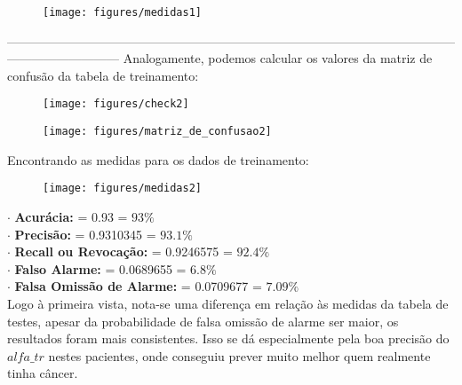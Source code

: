 \documentclass[leqno]{article}
\numberwithin{equation}{section}
\begin{document}
\begin{enumerate}
	\begin{figure}[H]
		\centering
		\texttt{[image: figures/medidas1]}
	\end{figure}
	
---------------------------------------------------------------------------------------------------------------------------------------
	Analogamente, podemos calcular os valores da matriz de confusão da tabela de treinamento:
	
	\begin{figure}[H]
		\centering
		\texttt{[image: figures/check2]}
	\end{figure}

	\begin{figure}[H]
		\centering
		\texttt{[image: figures/matriz\_de\_confusao2]}
	\end{figure}

	Encontrando as medidas para os dados de treinamento:
	
	\begin{figure}[H]
		\centering
		\texttt{[image: figures/medidas2]}
	\end{figure}

	$\cdot$ \textbf{{\normalsize Acurácia:}} = 0.93 = $93\%$\\
	$\cdot$ \textbf{{\normalsize Precisão:}} = 0.9310345 = $93.1\%$\\
	$\cdot$ \textbf{{\normalsize Recall ou Revocação:}} = 0.9246575 = $92.4\%$\\
	$\cdot$ \textbf{{\normalsize Falso Alarme:}} = 0.0689655 = $6.8\%$\\
	$\cdot$ \textbf{{\normalsize Falsa Omissão de Alarme:}} = 0.0709677 = $7.09\%$\\
	
	Logo à primeira vista, nota-se uma diferença em relação às medidas da tabela de testes, apesar da probabilidade de falsa omissão de alarme ser maior, os resultados foram mais consistentes. Isso se dá especialmente pela boa precisão do $alfa\_tr$ nestes pacientes, onde conseguiu prever muito melhor quem realmente tinha câncer.
\end{enumerate}
\end{document}
